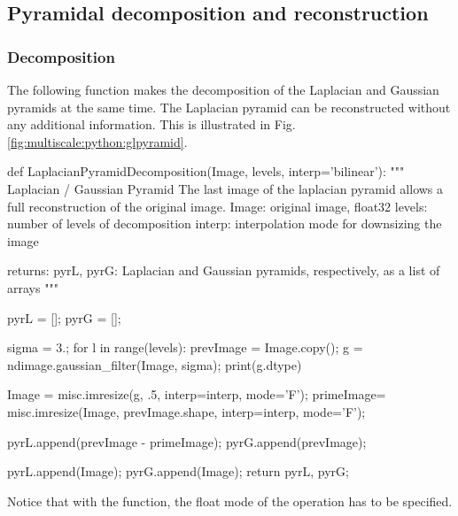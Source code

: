 \def\QRCODE{TB_image_TUT.IMG.multiscale_pythonqrcode.png}
\def\QRPAGE{http://www.iptutorials.science/tree/master/TB_image/TUT.IMG.multiscale/python}

\subsection{Pyramidal decomposition and re\-cons\-truc\-tion}
\subsubsection{Decomposition}
The following function makes the decomposition of the Laplacian and Gaussian pyramids at the same time. The Laplacian pyramid can be reconstructed without any additional information. This is illustrated in Fig. \ref{fig:multiscale:python:glpyramid}.


\begin{python}
def LaplacianPyramidDecomposition(Image, levels, interp='bilinear'):
    """
    Laplacian / Gaussian Pyramid
    The last image of the laplacian pyramid allows a full reconstruction of the original image.
    Image: original image, float32
    levels: number of levels of decomposition
    interp: interpolation mode for downsizing the image
    
    returns: pyrL, pyrG: Laplacian and Gaussian pyramids, respectively, as a list of arrays
    """
    
    pyrL = [];
    pyrG = [];
    
    sigma = 3.;
    for l in range(levels):
        prevImage = Image.copy();
        g = ndimage.gaussian_filter(Image, sigma);
        print(g.dtype)
        
        Image = misc.imresize(g, .5, interp=interp, mode='F');
        primeImage= misc.imresize(Image, prevImage.shape, interp=interp, mode='F');
        
        pyrL.append(prevImage - primeImage);
        pyrG.append(prevImage);
        
    pyrL.append(Image);
    pyrG.append(Image);
    return pyrL, pyrG;
\end{python}

\begin{phelp}
Notice that with the  function, the float mode of the operation has to be specified.
\end{phelp}




